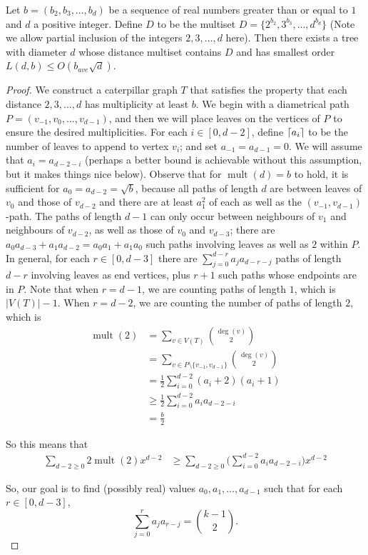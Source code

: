 \documentclass[12]{article}
\DeclarePairedDelimiter\ceil{\lceil}{\rceil}
\DeclareMathOperator{\mult}{mult}
\theoremstyle{definition}
\begin{document}
	Let $b= (b_2, b_3, \ldots, b_{d})$ be a sequence of real numbers greater than or equal to $1$ and $d$ a positive integer.   Define $D$ to be the multiset $D = \{2^{b_2}, 3^{b_3}, \ldots, d^{b_d}\}$ (Note we allow partial inclusion of the integers $2, 3, \dots, d$ here).  Then there exists a tree with diameter $d$ whose distance multiset contains $D$ and has smallest order $L(d, b) \leq O(b_{ave}\sqrt{d})$.
	
	\begin{proof}
		We construct a caterpillar graph $T$ that satisfies the property that each distance $2, 3, \ldots, d$ has multiplicity at least $b$.  We begin with a diametrical path $P = (v_{-1}, v_0, \ldots, v_{d-1})$, and then we will place leaves on the vertices of $P$ to ensure the desired multiplicities.  For each $i \in [0, d-2]$, define $\ceil{a_i}$ to be the number of leaves to append to vertex $v_i$; and set $a_{-1} = a_{d-1} = 0$.  We will assume that $a_i = a_{d-2-i}$ (perhaps a better bound is achievable without this assumption, but it makes things nice below).  Observe that for $\mult(d) = b$ to hold, it is sufficient for $a_0 = a_{d-2} = \sqrt{b}$, because all paths of length $d$ are between leaves of $v_0$ and those of $v_{d-2}$ and there are at least $a_1^2$ of each as well as the $(v_{-1},v_{d-1})$-path.  The paths of length $d-1$ can only occur between neighbours of $v_1$ and neighbours of $v_{d-2}$, as well as those of $v_0$ and $v_{d-3}$; there are $a_0a_{d-3} + a_1a_{d-2} = a_0a_1 + a_1a_0$ such paths involving leaves as well as $2$ within $P$.  In general, for each $r \in [0,d-3]$ there are $\sum_{j=0}^{d-r}a_ja_{d-r-j}$ paths of length $d-r$ involving leaves as end vertices, plus $r+1$ such paths whose endpoints are in $P$.  Note that when $r = d-1$, we are counting paths of length $1$, which is $|V(T)|-1$.  When $r = d-2$, we are counting the number of paths of length $2$,  which is
		\begin{align*}
			\mult(2) &= \sum_{v \in V(T)} {\deg(v) \choose 2}	\\
			&=\sum_{v \in P\setminus \{v_{-1}, v_{d-1}\}} {\deg(v) \choose 2}	\\
			&= \frac{1}{2}\sum_{i=0}^{d-2} (a_i+2)(a_i+1)	\\
			&\geq \frac{1}{2}\sum_{i = 0}^{d-2} a_ia_{d-2-i}	\\
			&= \frac{b}{2}
		\end{align*}
	
		So this means that 
		\begin{align*}
			\sum_{d-2 \geq 0}2\mult(2)x^{d-2} &\geq \sum_{d-2 \geq 0}\biggr(\sum_{i = 0}^{d-2} a_ia_{d-2-i} \biggr)x^{d-2}
		\end{align*}
		
		
		  So, our goal is to find (possibly real) values $a_0, a_1, \ldots, a_{d-1}$ such that for each $r \in [0,d-3]$, $$\sum_{j=0}^{r}a_ja_{r-j} = {k-1 \choose 2}.$$
	\end{proof}
	
\end{document}
